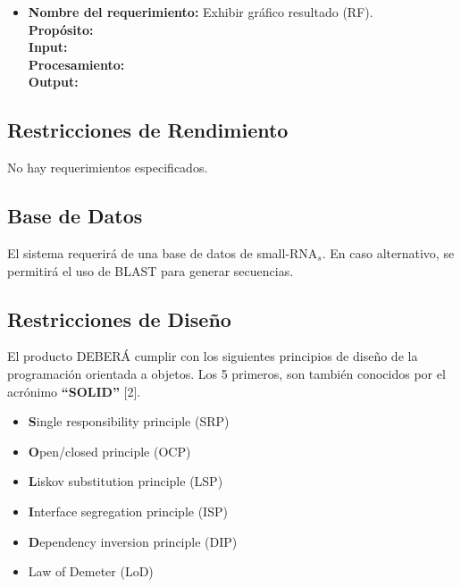 \documentclass[12pt,a4paper,english,spanish]{article}
\begin{document}
\begin{itemize}
		\item \textbf{Nombre del requerimiento:} Exhibir gráfico resultado (RF).\\
  	    \textbf{Propósito:} \\
		\textbf{Input:} \\
		\textbf{Procesamiento:} \\
		\textbf{Output:} \\

	\end{itemize}


\subsection{Restricciones de Rendimiento}
No hay requerimientos especificados.

\subsection{Base de Datos}
	\par El sistema requerirá de una base de datos de small-RNA$_s$. En caso alternativo, se permitirá el uso de BLAST para generar secuencias. 

\subsection{Restricciones de Diseño}
\par El producto DEBERÁ cumplir con los siguientes principios de diseño de la
programación orientada a objetos. Los 5 primeros, son también conocidos por
el acrónimo \textbf{``SOLID''} [2].
\begin{itemize}
	\item \textbf{S}ingle responsibility principle (SRP)
	\item \textbf{O}pen/closed principle (OCP)
	\item \textbf{L}iskov substitution principle (LSP)
	\item \textbf{I}nterface segregation principle (ISP)
	\item \textbf{D}ependency inversion principle (DIP)	
	\item Law of Demeter (LoD)
\end{itemize}
\end{document}
